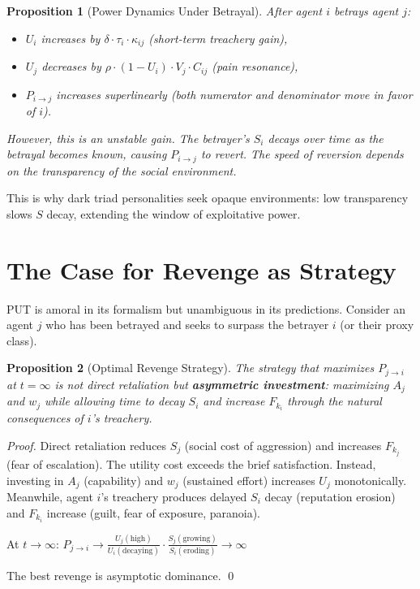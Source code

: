 \documentclass[12pt, a4paper]{article}
\newtheorem{proposition}{Proposition}[section]
\theoremstyle{remark}
\newcommand{\Fk}{F_k}
\begin{document}
\begin{proposition}[Power Dynamics Under Betrayal]
After agent $i$ betrays agent $j$:
\begin{itemize}[nosep]
    \item $U_i$ increases by $\delta \cdot \tau_i \cdot \kappa_{ij}$
          (short-term treachery gain),
    \item $U_j$ decreases by $\rho \cdot (1 - U_i) \cdot V_j \cdot C_{ij}$
          (pain resonance),
    \item $P_{i \to j}$ increases superlinearly (both numerator and
          denominator move in favor of $i$).
\end{itemize}
However, this is an unstable gain. The betrayer's $S_i$ decays over
time as the betrayal becomes known, causing $P_{i \to j}$ to revert.
The speed of reversion depends on the transparency of the social
environment.
\end{proposition}

This is why dark triad personalities seek opaque environments: low
transparency slows $S$ decay, extending the window of exploitative
power.

\section{The Case for Revenge as Strategy}

PUT is amoral in its formalism but unambiguous in its predictions.
Consider an agent $j$ who has been betrayed and seeks to surpass
the betrayer $i$ (or their proxy class).

\begin{proposition}[Optimal Revenge Strategy]
The strategy that maximizes $P_{j \to i}$ at $t = \infty$ is not
direct retaliation but \textbf{asymmetric investment}: maximizing
$A_j$ and $w_j$ while allowing time to decay $S_i$ and increase $\Fk_i$
through the natural consequences of $i$'s treachery.
\end{proposition}

\begin{proof}
Direct retaliation reduces $S_j$ (social cost of aggression) and
increases $\Fk_j$ (fear of escalation). The utility cost exceeds
the brief satisfaction. Instead, investing in $A_j$ (capability) and
$w_j$ (sustained effort) increases $U_j$ monotonically. Meanwhile,
agent $i$'s treachery produces delayed $S_i$ decay (reputation
erosion) and $\Fk_i$ increase (guilt, fear of exposure, paranoia).

At $t \to \infty$:
$P_{j \to i} \to \frac{U_j(\text{high})}{U_i(\text{decaying})}
\cdot \frac{S_j(\text{growing})}{S_i(\text{eroding})} \to \infty$

The best revenge is asymptotic dominance. \qed
\end{proof}
\end{document}
